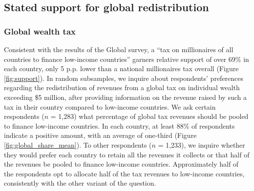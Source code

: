 \subsection{Stated support for global redistribution}\label{subsec:support_other}

\subsubsection{Global wealth tax}\label{subsubsec:support_global_wealth_tax}

Consistent with the results of the Global survey, a ``tax on millionaires of all countries to finance low-income countries'' garners relative support of over 69\% in each country, only 5 p.p. lower than a national millionaires tax overall (Figure \ref{fig:support}). In random subsamples, we inquire about respondents' preferences regarding the redistribution of revenues from a global tax on individual wealth exceeding \$5 million, after providing information on the revenue raised by such a tax in their country compared to low-income countries. 
We ask certain respondents ($n$ = 1,283) what percentage of global tax revenues should be pooled to finance low-income countries. In each country, at least 88\% of respondents indicate a positive amount, with an average of one-third %
(Figure \ref{fig:global_share_mean}). To other respondents ($n$ = 1,233), we inquire whether they would prefer each country to retain all the revenues it collects or that half of the revenues be pooled to finance low-income countries. Approximately half of the respondents opt to allocate half of the tax revenues to low-income countries, consistently with the other variant of the question.


